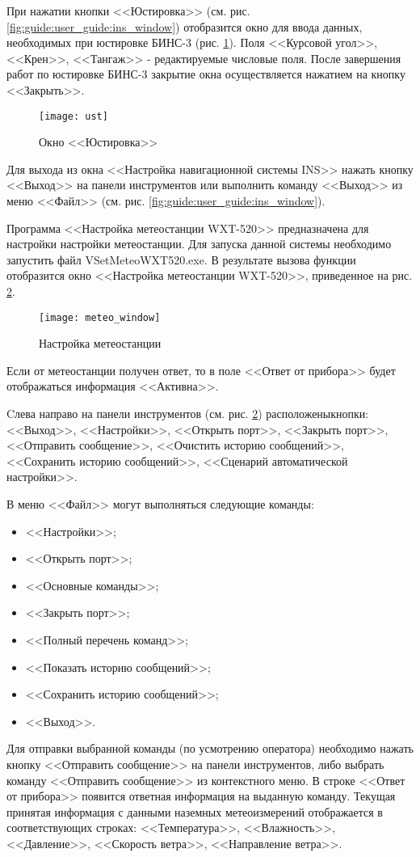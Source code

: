 При нажатии кнопки <<Юстировка>> (см. рис. \ref{fig:guide:user_guide:ins_window}) отобразится окно для ввода данных,
необходимых при юстировке БИНС-3 (рис. \ref{fig:guide:user_guide:ust}).
Поля <<Курсовой угол>>, <<Крен>>, <<Тангаж>> - редактируемые числовые поля.
После завершения работ по юстировке БИНС-3 закрытие окна осуществляется нажатием на кнопку <<Закрыть>>.
\begin{figure}[!h]
	\centering
	\texttt{[image: ust]}
	\caption{Окно <<Юстировка>>}
	\label{fig:guide:user_guide:ust}
\end{figure}
Для выхода из окна <<Настройка навигационной системы INS>> нажать кнопку <<Выход>> на панели инструментов
или выполнить команду <<Выход>> из меню <<Файл>> (см. рис. \ref{fig:guide:user_guide:ins_window}).

Программа <<Настройка метеостанции WXT-520>> предназначена для настройки настройки метеостанции.
Для запуска данной системы необходимо запустить файл VSetMeteoWXT520.exe.
В результате вызова функции отобразится окно <<Настройка метеостанции WXT-520>>, приведенное на рис.
\ref{fig:guide:user_guide:meteo_window}.
\begin{figure}[!h]
	\centering
	\texttt{[image: meteo\_window]}
	\caption{Настройка метеостанции}
	\label{fig:guide:user_guide:meteo_window}
\end{figure}
Если от метеостанции получен ответ, то в поле <<Ответ от прибора>> будет отображаться информация <<Активна>>.

Cлева направо на панели инструментов (см. рис. \ref{fig:guide:user_guide:meteo_window}) расположены\break кнопки: <<Выход>>,
<<Настройки>>, <<Открыть порт>>, <<Закрыть порт>>, <<Отправить сообщение>>, <<Очистить историю сообщений>>,
<<Сохранить историю сообщений>>, <<Сценарий автоматической настройки>>.

В меню <<Файл>> могут выполняться следующие команды:
\begin{itemize}
	\item <<Настройки>>;
	\item <<Открыть порт>>;
	\item <<Основные команды>>;
	\item <<Закрыть порт>>;
	\item <<Полный перечень команд>>;
	\item <<Показать историю сообщений>>;
	\item <<Сохранить историю сообщений>>;
	\item <<Выход>>.
\end{itemize}

Для отправки выбранной команды (по усмотрению оператора) необходимо нажать кнопку <<Отправить сообщение>> на панели инструментов, либо выбрать команду
<<Отправить сообщение>> из контекстного меню. В строке <<Ответ от прибора>> появится ответная информация на выданную команду.
Текущая принятая информация с данными наземных метеоизмерений отображается в соответствующих строках: <<Температура>>,
<<Влажность>>, <<Давление>>, <<Скорость ветра>>, <<Направление ветра>>.
